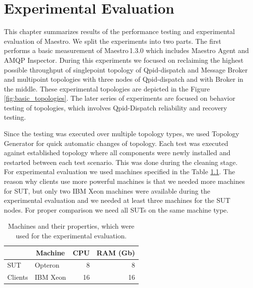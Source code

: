 
\chapter{Experimental Evaluation}
\label{Experimental Evaluation}
This chapter summarizes results of the performance testing and experimental evaluation of Maestro. We split the experiments into two parts. The first performs a basic measurement of Maestro\,1.3.0 which includes Maestro Agent and AMQP Inspector. During this experiments we focused on reclaiming the highest possible throughput of singlepoint topology of Qpid-dispatch and Message Broker and multipoint topologies with three nodes of Qpid-dispatch and with Broker in the middle. These experimental topologies are depicted in the Figure \ref{fig:basic_topologies}. The later series of experiments are focused on behavior testing of topologies, which involves Qpid-Dispatch reliability and recovery testing.

Since the testing was executed over multiple topology types, we used Topology Generator for quick automatic changes of topology. Each test was executed against established topology where all components were newly installed and restarted between each test scenario. This was done during the cleaning stage. For experimental evaluation we used machines specified in the Table \ref{tab:machines}. The reason why clients use more powerful machines is that we needed more machines for SUT, but only two IBM Xeon machines were available during the experimental evaluation and we needed at least three machines for the SUT nodes. For proper comparison we need all SUTs on the same machine type.

\begingroup
\setlength{\tabcolsep}{10pt} %
\renewcommand{\arraystretch}{1.35} %
	\begin{table}[H]
	\centering
	\caption{Machines and their properties, which were used for the experimental evaluation.}
	\label{tab:machines}
	\begin{tabular}{|l|l|r|r|}
	\hline
	\rowcolor[HTML]{C5E3DF}
	\textbf{} & \multicolumn{1}{c|}{\cellcolor[HTML]{C5E3DF}\textbf{Machine}} & \multicolumn{1}{c|}{\cellcolor[HTML]{C5E3DF}\textbf{CPU}} & \multicolumn{1}{c|}{\cellcolor[HTML]{C5E3DF}\textbf{RAM (Gb)}} \\ \hline
	SUT & Opteron & 8 & 8 \\ \hline
	Clients & IBM Xeon & 16 & 16 \\ \hline
	\end{tabular}
	\end{table}
\endgroup

